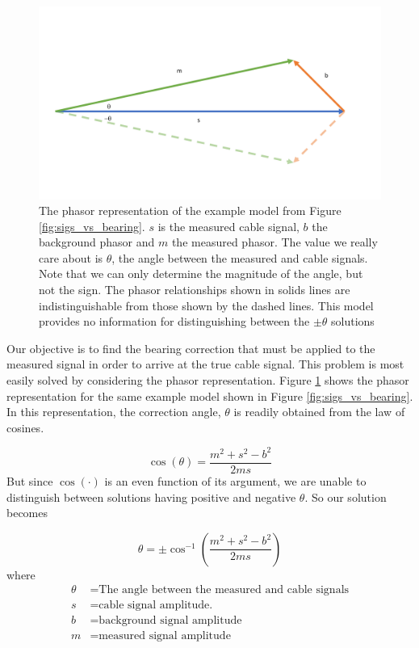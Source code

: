 \documentclass[paper=a4, fontsize=11pt]{scrartcl}
\numberwithin{equation}{section}		%
\numberwithin{figure}{section}			%
\numberwithin{table}{section}				%
\begin{document}
\begin{appendices}
\begin{figure}
  \caption{
  The phasor representation of the example model from Figure \ref{fig:sigs_vs_bearing}. $s$ is the measured cable signal, $b$ the background phasor and $m$ the measured phasor.  The value we really care about is $\theta$, the angle between the measured and cable signals.  Note that we can only determine the magnitude of the angle, but not the sign.  The phasor relationships shown in solids lines are indistinguishable from those shown by the dashed lines.  This model provides no information for distinguishing between the $\pm\theta$ solutions}
  \label{fig:phasor_base}
  \centering
  \includegraphics[width=1.0\textwidth]{figures/phasor_base.pdf}
\end{figure}

\par Our objective is to find the bearing correction that must be applied to the measured signal in order to arrive at the true cable signal.  This problem is most easily solved by considering the phasor representation.  Figure \ref{fig:phasor_base} shows the phasor representation for the same example model shown in Figure \ref{fig:sigs_vs_bearing}.  In this representation, the correction angle, $\theta$ is readily obtained from the law of cosines.

\begin{equation} \label{eq:law_of_cos}
    \cos\left(\theta\right) = \frac{m^2 + s^2 - b^2}{2ms}
\end{equation}
But since $\cos\left(\cdot\right)$ is an even function of its argument, we are unable to distinguish between solutions having positive and negative $\theta$.  So our solution becomes

\begin{equation} \label{eq:theta_solution}
\theta = \pm \cos^{-1}\left(\frac{m^2 + s^2 - b^2}{2ms}\right)
\end{equation}
where
\begin{align*}
        \theta &= \text{The angle between the measured and cable signals}\\
        s &= \text{cable signal amplitude.}\\
        b &= \text{background signal amplitude} \\
        m &= \text{measured signal amplitude} \\
\end{align*}




\end{appendices}
\end{document}
